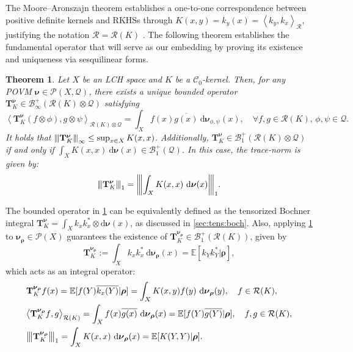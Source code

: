 \documentclass[noinfoline]{imsart}\setcounter{tocdepth}{2}
\renewcommand{\b}[1]{\mathbb{#1}} %
\newcommand{\m}[1]{\mathbf{#1}} %
\newcommand{\s}[1]{\mathscr{#1}} %
\renewcommand{\c}[1]{\mathcal{#1}} %
\newcommand{\mb}[1]{\boldsymbol{#1}} %
\newcommand{\rd}{\mathrm{d}} %
\newcommand{\vertiii}[1]{{\left\vert\kern-0.25ex\left\vert\kern-0.25ex\left\vert #1 
    \right\vert\kern-0.25ex\right\vert\kern-0.25ex\right\vert}} %
\newcommand{\innpr}[2]{{\left\langle {#1},{#2}\right\rangle}} %
\theoremstyle{plain}
\newtheorem{theorem}{Theorem}[section]
\begin{document}
The Moore–Aronszajn theorem \cite{aronszajn1950theory} establishes a one-to-one correspondence between positive definite kernels and RKHSs through $K(x,y)= k_{y}(x) = \innpr{k_{y}}{k_{x}}_{\c{R}}$, justifying the notation $\c{R}=\c{R}(K)$ \cite{paulsen2016introduction,hsing2015theoretical}.
The following theorem establishes the fundamental operator that will serve as our embedding by proving its existence and uniqueness via sesquilinear forms.

\begin{theorem}\label{thm:quant:cov:scalar}
Let $X$ be an LCH space and $K$ be a $\c{C}_{0}$-kernel. Then, for any POVM $\mb{\nu} \in \s{P}(X, \c{Q})$, there exists a unique bounded operator $\m{T}_{K}^{\mb{\nu}} \in \c{B}_{\infty}^{+}(\c{R}(K) \otimes \c{Q})$ satisfying
\begin{equation*}
    \innpr{\m{T}_{K}^{\mb{\nu}} (f \otimes \phi)}{g \otimes \psi}_{\c{R}(K) \otimes \c{Q}} = \int_{X} f(x) \overline{g(x)} \ \rd \mb{\nu}_{\phi, \psi}(x), \quad \forall f, g \in \c{R}(K), \, \phi,\psi \in \c{Q}.
\end{equation*}
It holds that $\vertiii{\m{T}_{K}^{\mb{\nu}}}_{\infty} \le \sup_{x \in X} K(x, x)$. Additionally, $\m{T}_{K}^{\mb{\nu}} \in \c{B}_{1}^{+}(\c{R}(K) \otimes \c{Q})$ if and only if $\int_{X} K(x, x) \ \rd \mb{\nu}(x) \in \c{B}_{1}^{+}(\c{Q})$. In this case, the trace-norm is given by:
\begin{align*}
    \vertiii{\m{T}_{K}^{\mb{\nu}}}_{1} = \vertiii{\int_{X} K(x, x) \ \rd \mb{\nu}(x)}_{1}.
\end{align*}
\end{theorem}

The bounded operator in \cref{thm:quant:cov:scalar} can be equivalently defined as the tensorized Bochner integral $\m{T}_{K}^{\mb{\nu}} = \int_{X} k_{x} k_{x}^{*} \otimes \rd \mb{\nu} (x)$, as discussed in \cref{sec:tens:boch}.
Also, applying \cref{thm:quant:cov:scalar} to $\mb{\nu}_{\mb{\rho}} \in \s{P}(X)$ guarantees the existence of $\m{T}_{K}^{\mb{\nu}_{\mb{\rho}}} \in \c{B}_{1}^{+}(\c{R}(K))$, given by
\begin{equation}\label{eq:tr:contra:embed:scalar}
    \m{T}_{K}^{\mb{\nu}_{\mb{\rho}}} := \int_{X} k_{x} k_{x}^{*} \ \rd \mb{\nu}_{\mb{\rho}} (x) = \b{E}[k_{Y} k_{Y}^{*} | \mb{\rho}],
\end{equation}
which acts as an integral operator:
\begin{align*}
    &\m{T}_{K}^{\mb{\nu}_{\mb{\rho}}} f(x) = \b{E}[f(Y) \overline{k_{x}(Y)} | \mb{\rho}] = \int_{X} K(x, y) f(y) \ \rd \mb{\nu}_{\mb{\rho}}(y), \quad f \in \c{R}(K), \\
    &\innpr{\m{T}_{K}^{\mb{\nu}_{\mb{\rho}}} f}{g}_{\c{R}(K)} = \int_{X} f(x) \overline{g(x)} \ \rd \mb{\nu}_{\mb{\rho}}(x) = \b{E}[f(Y) \overline{g(Y)} | \mb{\rho}], \quad f, g \in \c{R}(K), \\
    &\vertiii{\m{T}_{K}^{\mb{\nu}_{\mb{\rho}}}}_{1} = \int_{X} K(x, x) \ \rd \mb{\nu}_{\mb{\rho}}(x) = \b{E}[K(Y, Y) | \mb{\rho}].
\end{align*}
\end{document}
